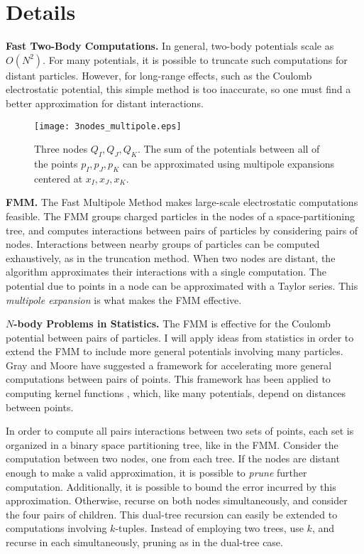\documentclass[twoside,leqno, 12pt]{article}
\begin{document}
\section{Details}
\textbf{Fast Two-Body Computations.}  In general, two-body potentials scale as $O(N^2)$.  For many potentials, it is possible to truncate such computations for distant particles.  However, for long-range effects, such as the Coulomb electrostatic potential, this simple method is too inaccurate, so one must find a better approximation for distant interactions.  

\begin{figure}[th]
\centering
\texttt{[image: 3nodes\_multipole.eps]}
\caption{Three nodes $Q_I, Q_J, Q_K$.  The sum of the potentials between all of the points $p_I, p_J, p_K$ can be approximated using multipole expansions centered at $x_I, x_J, x_K$.}
\label{three_nodes}
\end{figure}

\textbf{FMM.}  The Fast Multipole Method \cite{grngard} makes large-scale electrostatic computations feasible.  The FMM groups charged particles in the nodes of a space-partitioning tree, and computes interactions between pairs of particles by considering pairs of nodes.  Interactions between nearby groups of particles can be computed exhaustively, as in the truncation method.  When two nodes are distant, the algorithm approximates their interactions with a single computation.  The potential due to points in a node can be approximated with a Taylor series.  This \emph{multipole expansion} is what makes the FMM effective.


\textbf{$N$-body Problems in Statistics.}  The FMM is effective for the Coulomb potential between pairs of particles.  I will apply ideas from statistics in order to extend the FMM to include more general potentials involving many particles.  Gray and Moore \cite{gray_nbody} have suggested a framework for accelerating more general computations between pairs of points.  This framework has been applied to computing kernel functions \cite{NIPS2005_570}, which, like many potentials, depend on distances between points.

In order to compute all pairs interactions between two sets of points, each set is organized in a binary space partitioning tree, like in the FMM.  Consider the computation between two nodes, one from each tree.  If the nodes are distant enough to make a valid approximation, it is possible to \emph{prune} further computation.  Additionally, it is possible to bound the error incurred by this approximation.  Otherwise, recurse on both nodes simultaneously, and consider the four pairs of children.  This dual-tree recursion can easily be extended to computations involving $k$-tuples.  Instead of employing two trees,  use $k$, and recurse in each simultaneously, pruning as in the dual-tree case. 
\end{document}
